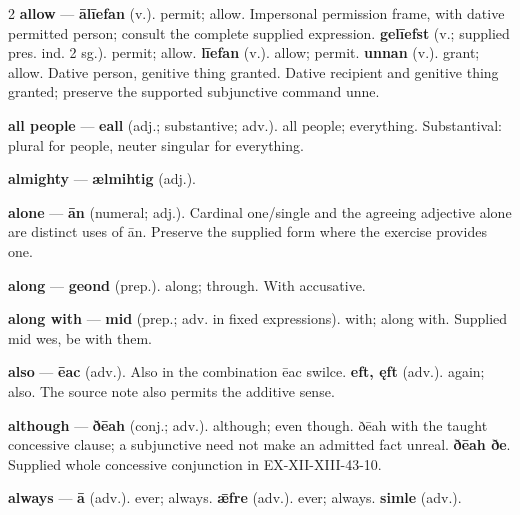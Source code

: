 \begin{multicols}{2}
\textbf{allow} — \textbf{ālīefan} (v.). permit; allow. Impersonal permission frame, with dative permitted person; consult the complete supplied expression. \textbf{gelīefst} (v.; supplied pres. ind. 2 sg.). permit; allow. \textbf{līefan} (v.). allow; permit. \textbf{unnan} (v.). grant; allow. Dative person, genitive thing granted. Dative recipient and genitive thing granted; preserve the supported subjunctive command unne.\par
\textbf{all people} — \textbf{eall} (adj.; substantive; adv.). all people; everything. Substantival: plural for people, neuter singular for everything.\par
\textbf{almighty} — \textbf{ælmihtig} (adj.).\par
\textbf{alone} — \textbf{ān} (numeral; adj.). Cardinal one/single and the agreeing adjective alone are distinct uses of ān. Preserve the supplied form where the exercise provides one.\par
\textbf{along} — \textbf{geond} (prep.). along; through. With accusative.\par
\textbf{along with} — \textbf{mid} (prep.; adv. in fixed expressions). with; along with. Supplied mid wes, be with them.\par
\textbf{also} — \textbf{ēac} (adv.). Also in the combination ēac swilce. \textbf{eft, ęft} (adv.). again; also. The source note also permits the additive sense.\par
\textbf{although} — \textbf{ðēah} (conj.; adv.). although; even though. ðēah with the taught concessive clause; a subjunctive need not make an admitted fact unreal. \textbf{ðēah ðe}. Supplied whole concessive conjunction in EX-XII-XIII-43-10.\par
\textbf{always} — \textbf{ā} (adv.). ever; always. \textbf{ǣfre} (adv.). ever; always. \textbf{simle} (adv.).\par

\end{multicols}
